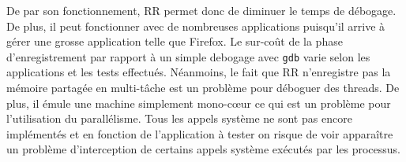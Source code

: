 De par son fonctionnement, RR permet donc de diminuer le temps de débogage. De
plus, il peut fonctionner avec de nombreuses applications puisqu'il arrive à
gérer une grosse application telle que Firefox. Le sur-coût de la phase
d'enregistrement par rapport à un simple debogage avec \texttt{gdb} varie selon les
applications et les tests effectués. Néanmoins, le fait que RR n'enregistre pas
la mémoire partagée en multi-tâche est un problème pour déboguer des threads. De
plus, il émule une machine simplement mono-c\oe ur ce qui est un problème pour
l'utilisation du parallélisme. Tous les appels système ne sont pas encore
implémentés et en fonction de l'application à tester on risque de voir
apparaître un problème d'interception de certains appels système exécutés par
les processus.
